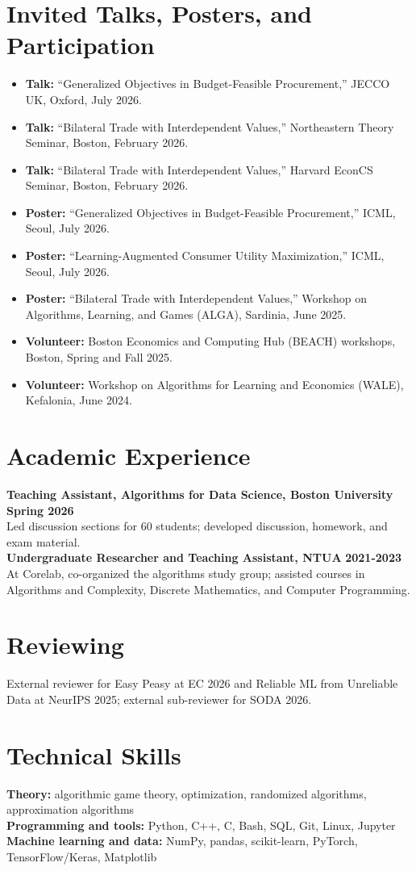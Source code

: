 \documentclass[10pt,letterpaper]{article}
\begin{document}
\section{Invited Talks, Posters, and Participation}
\begin{itemize}
  \item \textbf{Talk:} ``Generalized Objectives in Budget-Feasible Procurement,'' JECCO UK, Oxford, July 2026.
  \item \textbf{Talk:} ``Bilateral Trade with Interdependent Values,'' Northeastern Theory Seminar, Boston, February 2026.
  \item \textbf{Talk:} ``Bilateral Trade with Interdependent Values,'' Harvard EconCS Seminar, Boston, February 2026.
  \item \textbf{Poster:} ``Generalized Objectives in Budget-Feasible Procurement,'' ICML, Seoul, July 2026.
  \item \textbf{Poster:} ``Learning-Augmented Consumer Utility Maximization,'' ICML, Seoul, July 2026.
  \item \textbf{Poster:} ``Bilateral Trade with Interdependent Values,'' Workshop on Algorithms, Learning, and Games (ALGA), Sardinia, June 2025.
  \item \textbf{Volunteer:} Boston Economics and Computing Hub (BEACH) workshops, Boston, Spring and Fall 2025.
  \item \textbf{Volunteer:} Workshop on Algorithms for Learning and Economics (WALE), Kefalonia, June 2024.
\end{itemize}

\section{Academic Experience}
\textbf{Teaching Assistant, Algorithms for Data Science, Boston University} \hfill \textbf{Spring 2026}\\[-2pt]
Led discussion sections for 60 students; developed discussion, homework, and exam material.\\[2pt]
\textbf{Undergraduate Researcher and Teaching Assistant, NTUA} \hfill \textbf{2021-2023}\\[-2pt]
At Corelab, co-organized the algorithms study group; assisted courses in Algorithms and Complexity, Discrete Mathematics, and Computer Programming.

\section{Reviewing}
External reviewer for Easy Peasy at EC 2026 and Reliable ML from Unreliable Data at NeurIPS 2025; external sub-reviewer for SODA 2026.

\section{Technical Skills}
\textbf{Theory:} algorithmic game theory, optimization, randomized algorithms, approximation algorithms\\
\textbf{Programming and tools:} Python, C++, C, Bash, SQL, Git, Linux, Jupyter\\
\textbf{Machine learning and data:} NumPy, pandas, scikit-learn, PyTorch, TensorFlow/Keras, Matplotlib
\end{document}
